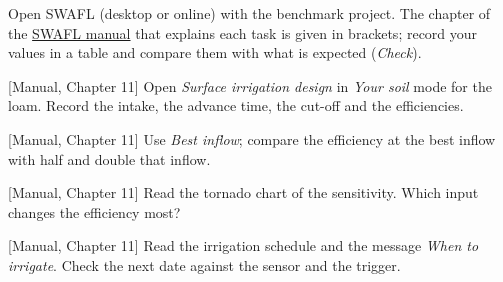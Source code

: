 {\small Open SWAFL (desktop or online) with the benchmark project. The chapter of the \href{https://github.com/halilunaziru73-creator/Coupled-Water-Fluxes-Pore-Scale-Dynamics-Precision-Irrigation-Mulching-Feedback-Loops/raw/main/Software/v1.1.0/SWAFL_Desktop/docs/manual_v1.1.0/SWAFL_Manual_v1.1.0.pdf}{SWAFL manual} that explains each task is given in brackets; record your values in a table and compare them with what is expected (\emph{Check}).}\par\vspace{3pt}
\begin{exlist}
\item {\color{khblue}[Manual, Chapter 11]} Open \emph{Surface irrigation design} in \emph{Your soil} mode for the loam. Record the intake, the advance time, the cut-off and the efficiencies.\par{}
\item {\color{khblue}[Manual, Chapter 11]} Use \emph{Best inflow}; compare the efficiency at the best inflow with half and double that inflow.\par{}
\item {\color{khblue}[Manual, Chapter 11]} Read the tornado chart of the sensitivity. Which input changes the efficiency most?\par{}
\item {\color{khblue}[Manual, Chapter 11]} Read the irrigation schedule and the message \emph{When to irrigate}. Check the next date against the sensor and the trigger.\par{}
\end{exlist}
